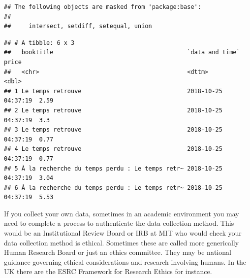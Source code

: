 \documentclass[]{book}
\newenvironment{Shaded}{\begin{snugshade}}{\end{snugshade}}
\newcommand{\KeywordTok}[1]{\textcolor[rgb]{0.13,0.29,0.53}{\textbf{#1}}}
\newcommand{\StringTok}[1]{\textcolor[rgb]{0.31,0.60,0.02}{#1}}
\newcommand{\OperatorTok}[1]{\textcolor[rgb]{0.81,0.36,0.00}{\textbf{#1}}}
\newcommand{\NormalTok}[1]{#1}
\theoremstyle{definition}
\theoremstyle{definition}
\theoremstyle{definition}
\theoremstyle{remark}
\begin{document}
\begin{verbatim}
## The following objects are masked from 'package:base':
## 
##     intersect, setdiff, setequal, union
\end{verbatim}

\begin{Shaded}
\end{Shaded}

\begin{verbatim}
## # A tibble: 6 x 3
##   booktitle                                      `data and time`     price
##   <chr>                                          <dttm>              <dbl>
## 1 Le temps retrouve                              2018-10-25 04:37:19  2.59
## 2 Le temps retrouve                              2018-10-25 04:37:19  3.3 
## 3 Le temps retrouve                              2018-10-25 04:37:19  0.77
## 4 Le temps retrouve                              2018-10-25 04:37:19  0.77
## 5 À la recherche du temps perdu : Le temps retr~ 2018-10-25 04:37:19  3.04
## 6 À la recherche du temps perdu : Le temps retr~ 2018-10-25 04:37:19  5.53
\end{verbatim}

If you collect your own data, sometimes in an academic environment you
may need to complete a process to authenticate the data collection
method. This would be an Institutional Review Board or IRB at MIT who
would check your data collection method is ethical. Sometimes these are
called more generically Human Research Board or just an ethics
committee. They may be national guidance governing ethical
considerations and research involving humans. In the UK there are the
ESRC Framework for Research Ethics for instance.
\end{document}
